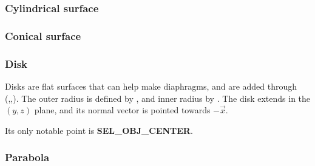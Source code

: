 \subsubsection{Cylindrical surface}

\newpage
\subsubsection{Conical surface}

\newpage
\subsubsection{Disk}

Disks are flat surfaces that can help make diaphragms, and are added through (,,). The outer radius is defined by , and inner radius by . The disk extends in the $(y,z)$ plane, and its normal vector is pointed towards $-\vec x$.

Its only notable point is \textbf{SEL\_OBJ\_CENTER}.

\newpage
\subsubsection{Parabola}

